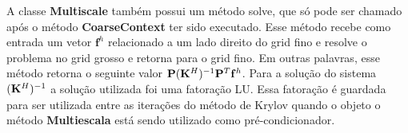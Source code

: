 A classe \textbf{Multiscale} também possui um método solve, que só pode ser chamado após o método \textbf{CoarseContext} ter sido executado. Esse método recebe como entrada um vetor $\mathbf{f}^h$ relacionado a um lado direito do grid fino e resolve o problema no grid grosso e retorna para o grid fino. Em outras palavras, esse método retorna o seguinte valor $\mathbf{P}(\mathbf{K}^H)^{-1}\mathbf{P}^T \mathbf{f}^h$. Para a solução do sistema $(\mathbf{K}^H)^{-1}$ a solução utilizada foi uma fatoração LU. Essa fatoração é guardada para ser utilizada entre as iterações do método de Krylov quando o objeto o método \textbf{Multiescala} está sendo utilizado como pré-condicionador.

                                                                                   